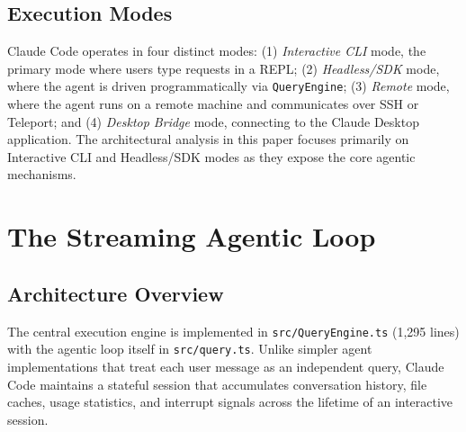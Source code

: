 \documentclass{article}
\begin{document}
\subsection{Execution Modes}

Claude Code operates in four distinct modes: (1) \textit{Interactive CLI} mode, the primary mode where users type requests in a REPL; (2) \textit{Headless/SDK} mode, where the agent is driven programmatically via \texttt{QueryEngine}; (3) \textit{Remote} mode, where the agent runs on a remote machine and communicates over SSH or Teleport; and (4) \textit{Desktop Bridge} mode, connecting to the Claude Desktop application. The architectural analysis in this paper focuses primarily on Interactive CLI and Headless/SDK modes as they expose the core agentic mechanisms.

\section{The Streaming Agentic Loop}

\subsection{Architecture Overview}

The central execution engine is implemented in \texttt{src/QueryEngine.ts} (1,295 lines) with the agentic loop itself in \texttt{src/query.ts}. Unlike simpler agent implementations that treat each user message as an independent query, Claude Code maintains a stateful session that accumulates conversation history, file caches, usage statistics, and interrupt signals across the lifetime of an interactive session.
\end{document}
